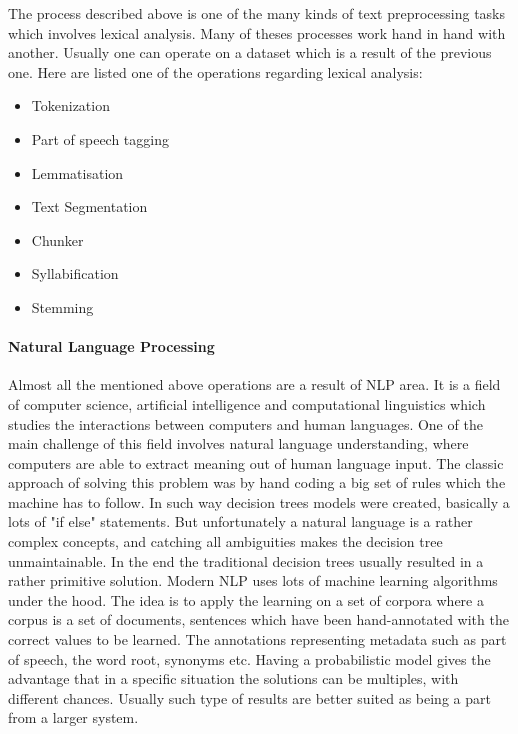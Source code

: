 The process described above is one of the many kinds of text preprocessing tasks which involves lexical analysis. Many of theses processes work hand in hand with another. Usually one can operate on a dataset which is a result of the previous one. Here are listed one of the operations regarding lexical analysis:
\begin{itemize}
    \item Tokenization
    \item Part of speech tagging
    \item Lemmatisation
    \item Text Segmentation
    \item Chunker
    \item Syllabification
    \item Stemming
\end{itemize}

\paragraph{Natural Language Processing}
Almost all the mentioned above operations are a result of NLP area. It is a field of computer science, artificial intelligence and computational linguistics which studies the interactions between computers and human languages. One of the main challenge of this field involves natural language understanding, where computers are able to extract meaning out of human language input. The classic approach of solving this problem was by hand coding a big set of rules which the machine has to follow. In such way decision trees models were created, basically a lots of "if else" statements. But unfortunately a natural language is a rather complex concepts, and catching all ambiguities makes the decision tree unmaintainable. In the end the traditional decision trees usually resulted in a rather primitive solution. Modern NLP uses lots of machine learning algorithms under the hood. The idea is to apply the learning on a set of corpora where a corpus is a set of documents, sentences which have been hand-annotated with the correct values to be learned. The annotations representing metadata such as part of speech, the word root, synonyms etc. Having a probabilistic model gives the advantage that in a specific situation the solutions can be multiples, with different chances. Usually such type of results are better suited as being a part from a larger system.

